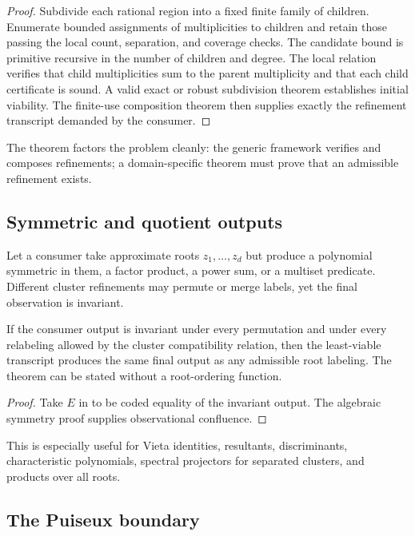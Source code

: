 \begin{proof}
Subdivide each rational region into a fixed finite family of children.  Enumerate bounded assignments of multiplicities to children and retain those passing the local count, separation, and coverage checks.  The candidate bound is primitive recursive in the number of children and degree.  The local relation verifies that child multiplicities sum to the parent multiplicity and that each child certificate is sound.  A valid exact or robust subdivision theorem establishes initial viability.  The finite-use composition theorem then supplies exactly the refinement transcript demanded by the consumer.
\end{proof}

The theorem factors the problem cleanly: the generic framework verifies and composes refinements; a domain-specific theorem must prove that an admissible refinement exists.

\subsection{Symmetric and quotient outputs}

Let a consumer take approximate roots $z_1,\ldots,z_d$ but produce a polynomial symmetric in them, a factor product, a power sum, or a multiset predicate.  Different cluster refinements may permute or merge labels, yet the final observation is invariant.

\begin{corollary}
\label{cor:unordered-root}
If the consumer output is invariant under every permutation and under every relabeling allowed by the cluster compatibility relation, then the least-viable transcript produces the same final output as any admissible root labeling.  The theorem can be stated without a root-ordering function.
\end{corollary}

\begin{proof}
Take $E$ in  to be coded equality of the invariant output.  The algebraic symmetry proof supplies observational confluence.
\end{proof}

This is especially useful for Vieta identities, resultants, discriminants, characteristic polynomials, spectral projectors for separated clusters, and products over all roots.

\subsection{The Puiseux boundary}

